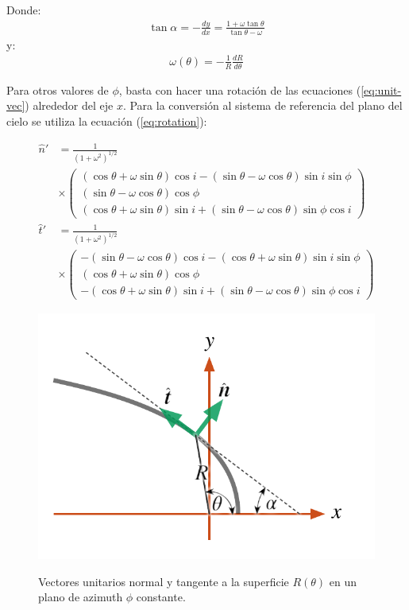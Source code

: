 Donde:
\begin{align}
  \tan\alpha = -\frac{dy}{dx} = \frac{1+\omega\tan\theta}{\tan\theta-\omega}
\end{align}
y:
\begin{align}
  \omega(\theta) = -\frac{1}{R}\frac{dR}{d\theta} 
\end{align}

Para otros valores de $\phi$, basta con hacer una rotación de las ecuaciones
(\ref{eq:unit-vec}) alrededor del eje $x$. Para la conversión al sistema de
referencia del plano del cielo se utiliza la ecuación (\ref{eq:rotation}):

\begin{align}
  \hat{n}' &= \frac{1}{\left(1 + \omega^2\right)^{1/2}} \\
           & \times \left(
             \begin{array}{c}
               (\cos\theta+\omega\sin\theta)\cos i-(\sin\theta-\omega\cos\theta)\sin i\sin\phi\\
               (\sin\theta-\omega\cos\theta)\cos\phi \\
               (\cos\theta+\omega\sin\theta)\sin i+(\sin\theta-\omega\cos\theta)\sin\phi\cos i
             \end{array}
                    \right) \\
    \hat{t}' &= \frac{1}{\left(1 + \omega^2\right)^{1/2}} \\
           & \times \left(
             \begin{array}{c}
               -(\sin\theta-\omega\cos\theta)\cos i-(\cos\theta+\omega\sin\theta)\sin i\sin\phi\\
               (\cos\theta+\omega\sin\theta)\cos\phi \\
               -(\cos\theta+\omega\sin\theta)\sin i+(\sin\theta-\omega\cos\theta)\sin\phi\cos i
             \end{array}
             \right) 
\end{align}


\begin{figure}
  \includegraphics[width=0.8\linewidth]{./Figures/bowshock-unit-vectors}
  \label{fig:unit-vec}
  \caption{Vectores unitarios normal y tangente a la superficie $R(\theta)$
    en un plano de azimuth $\phi$ constante.}
\end{figure}


